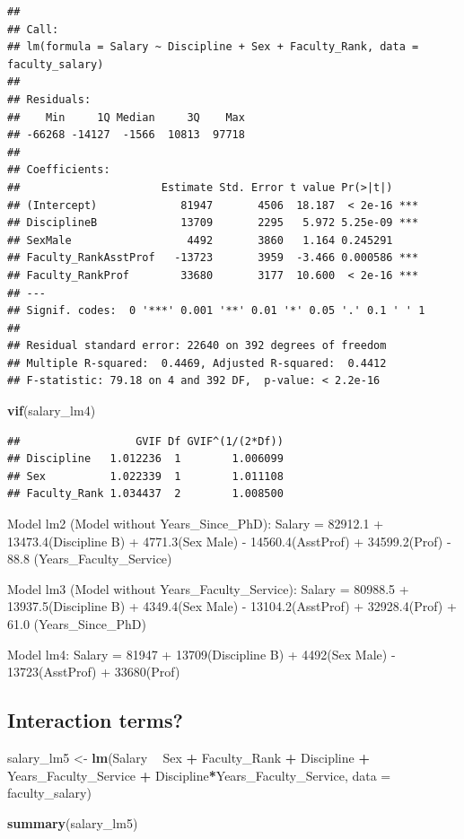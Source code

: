 \documentclass[]{article}
\newenvironment{Shaded}{\begin{snugshade}}{\end{snugshade}}
\newcommand{\KeywordTok}[1]{\textcolor[rgb]{0.13,0.29,0.53}{\textbf{#1}}}
\newcommand{\DataTypeTok}[1]{\textcolor[rgb]{0.13,0.29,0.53}{#1}}
\newcommand{\StringTok}[1]{\textcolor[rgb]{0.31,0.60,0.02}{#1}}
\newcommand{\OperatorTok}[1]{\textcolor[rgb]{0.81,0.36,0.00}{\textbf{#1}}}
\newcommand{\NormalTok}[1]{#1}
\begin{document}
\begin{verbatim}
## 
## Call:
## lm(formula = Salary ~ Discipline + Sex + Faculty_Rank, data = faculty_salary)
## 
## Residuals:
##    Min     1Q Median     3Q    Max 
## -66268 -14127  -1566  10813  97718 
## 
## Coefficients:
##                      Estimate Std. Error t value Pr(>|t|)    
## (Intercept)             81947       4506  18.187  < 2e-16 ***
## DisciplineB             13709       2295   5.972 5.25e-09 ***
## SexMale                  4492       3860   1.164 0.245291    
## Faculty_RankAsstProf   -13723       3959  -3.466 0.000586 ***
## Faculty_RankProf        33680       3177  10.600  < 2e-16 ***
## ---
## Signif. codes:  0 '***' 0.001 '**' 0.01 '*' 0.05 '.' 0.1 ' ' 1
## 
## Residual standard error: 22640 on 392 degrees of freedom
## Multiple R-squared:  0.4469, Adjusted R-squared:  0.4412 
## F-statistic: 79.18 on 4 and 392 DF,  p-value: < 2.2e-16
\end{verbatim}

\begin{Shaded}
\begin{Highlighting}[]
\KeywordTok{vif}\NormalTok{(salary_lm4)}
\end{Highlighting}
\end{Shaded}

\begin{verbatim}
##                  GVIF Df GVIF^(1/(2*Df))
## Discipline   1.012236  1        1.006099
## Sex          1.022339  1        1.011108
## Faculty_Rank 1.034437  2        1.008500
\end{verbatim}

Model lm2 (Model without Years\_Since\_PhD): Salary = 82912.1 +
13473.4(Discipline B) + 4771.3(Sex Male) - 14560.4(AsstProf) +
34599.2(Prof) - 88.8 (Years\_Faculty\_Service)

Model lm3 (Model without Years\_Faculty\_Service): Salary = 80988.5 +
13937.5(Discipline B) + 4349.4(Sex Male) - 13104.2(AsstProf) +
32928.4(Prof) + 61.0 (Years\_Since\_PhD)

Model lm4: Salary = 81947 + 13709(Discipline B) + 4492(Sex Male) -
13723(AsstProf) + 33680(Prof)

\subsection{Interaction terms?}\label{interaction-terms}

\begin{Shaded}
\begin{Highlighting}[]
\NormalTok{salary_lm5 <-}\StringTok{ }\KeywordTok{lm}\NormalTok{(Salary }\OperatorTok{~}\StringTok{ }\NormalTok{Sex }\OperatorTok{+}\StringTok{ }\NormalTok{Faculty_Rank }\OperatorTok{+}\StringTok{ }\NormalTok{Discipline }\OperatorTok{+}\StringTok{ }\NormalTok{Years_Faculty_Service }\OperatorTok{+}\StringTok{ }\NormalTok{Discipline}\OperatorTok{*}\NormalTok{Years_Faculty_Service, }\DataTypeTok{data =}\NormalTok{ faculty_salary)}

\KeywordTok{summary}\NormalTok{(salary_lm5)}
\end{Highlighting}
\end{Shaded}
\end{document}

